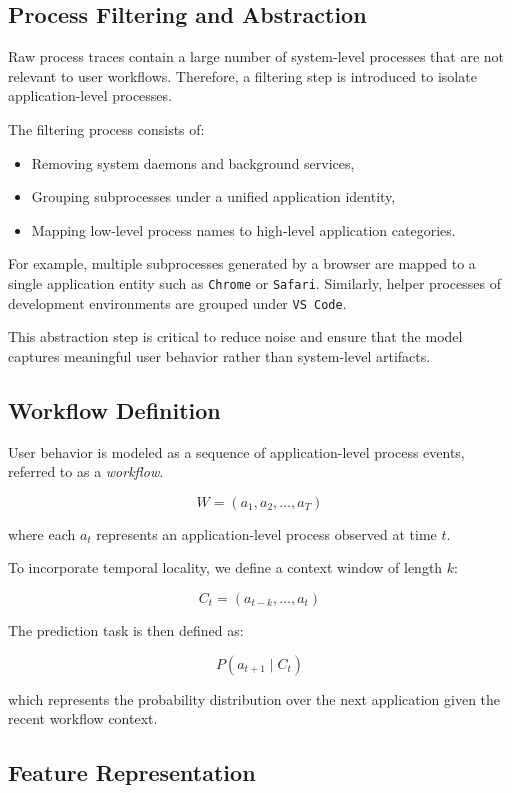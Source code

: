 \documentclass[11pt]{article}
\begin{document}
\subsection{Process Filtering and Abstraction}

Raw process traces contain a large number of system-level processes that are not relevant to user workflows. Therefore, a filtering step is introduced to isolate application-level processes.

The filtering process consists of:

\begin{itemize}
\item Removing system daemons and background services,
\item Grouping subprocesses under a unified application identity,
\item Mapping low-level process names to high-level application categories.
\end{itemize}

For example, multiple subprocesses generated by a browser are mapped to a single application entity such as \texttt{Chrome} or \texttt{Safari}. Similarly, helper processes of development environments are grouped under \texttt{VS Code}.

This abstraction step is critical to reduce noise and ensure that the model captures meaningful user behavior rather than system-level artifacts.

\subsection{Workflow Definition}

User behavior is modeled as a sequence of application-level process events, referred to as a \emph{workflow}.

\[
W = (a_1, a_2, \dots, a_T)
\]

where each $a_t$ represents an application-level process observed at time $t$.

To incorporate temporal locality, we define a context window of length $k$:

\[
C_t = (a_{t-k}, \dots, a_t)
\]

The prediction task is then defined as:

\[
P(a_{t+1} \mid C_t)
\]

which represents the probability distribution over the next application given the recent workflow context.

\subsection{Feature Representation}
\end{document}
